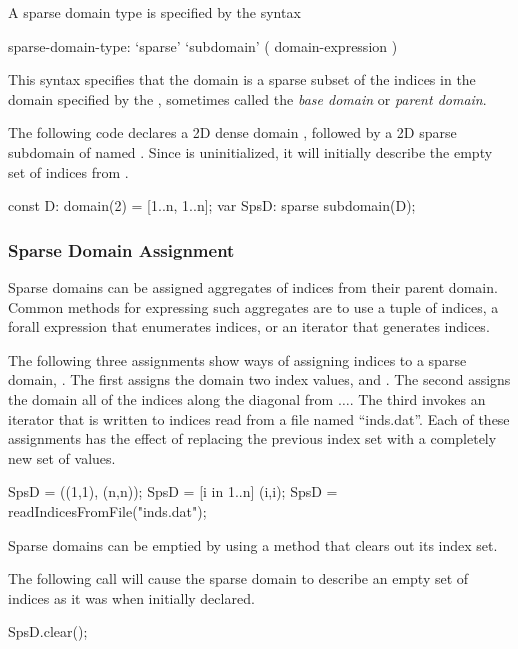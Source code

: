 A sparse domain type is specified by the syntax
\begin{syntax}
sparse-domain-type:
  `sparse' `subdomain' ( domain-expression )
\end{syntax}
This syntax specifies that the domain is a sparse subset of the
indices in the domain specified by the ,
sometimes called the \emph{base domain} or \emph{parent domain}.

\begin{example}
The following code declares a 2D dense domain , followed by a
2D sparse subdomain of  named .  Since 
is uninitialized, it will initially describe the empty set of indices
from .
\begin{chapel}
const D: domain(2) = [1..n, 1..n];
var SpsD: sparse subdomain(D);
\end{chapel}
\end{example}


\subsubsection{Sparse Domain Assignment}

Sparse domains can be assigned aggregates of indices from their parent
domain.  Common methods for expressing such aggregates are to use a
tuple of indices, a forall expression that enumerates indices, or an
iterator that generates indices.

\begin{example}
The following three assignments show ways of assigning indices to a
sparse domain, .  The first assigns the domain two index
values,  and .  The second assigns the domain
all of the indices along the diagonal from
$\ldots$.  The third invokes an iterator that
is written to  indices read from a file named
``inds.dat''.  Each of these assignments has the effect of replacing
the previous index set with a completely new set of values.
\begin{chapel}
SpsD = ((1,1), (n,n));
SpsD = [i in 1..n] (i,i);
SpsD = readIndicesFromFile("inds.dat");
\end{chapel}
\end{example}

Sparse domains can be emptied by using a method  that
clears out its index set.

\begin{example}
The following call will cause the sparse domain  to
describe an empty set of indices as it was when initially declared.
\begin{chapel}
SpsD.clear();
\end{chapel}
\end{example}

